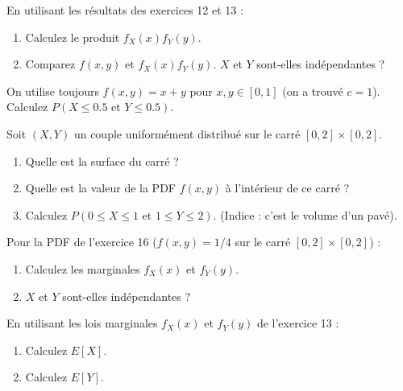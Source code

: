 \begin{exercicebox}
En utilisant les résultats des exercices 12 et 13 :
\begin{enumerate}
    \item Calculez le produit $f_X(x) f_Y(y)$.
    \item Comparez $f(x,y)$ et $f_X(x) f_Y(y)$. $X$ et $Y$ sont-elles indépendantes ?
\end{enumerate}
\end{exercicebox}

\begin{exercicebox}
On utilise toujours $f(x,y) = x+y$ pour $x, y \in [0, 1]$ (on a trouvé $c=1$).
Calculez $P(X \le 0.5 \text{ et } Y \le 0.5)$.
\end{exercicebox}

\begin{exercicebox}
Soit $(X, Y)$ un couple uniformément distribué sur le carré $[0, 2] \times [0, 2]$.
\begin{enumerate}
    \item Quelle est la surface du carré ?
    \item Quelle est la valeur de la PDF $f(x, y)$ à l'intérieur de ce carré ?
    \item Calculez $P(0 \le X \le 1 \text{ et } 1 \le Y \le 2)$. (Indice : c'est le volume d'un pavé).
\end{enumerate}
\end{exercicebox}

\begin{exercicebox}
Pour la PDF de l'exercice 16 ($f(x,y) = 1/4$ sur le carré $[0,2]\times[0,2]$) :
\begin{enumerate}
    \item Calculez les marginales $f_X(x)$ et $f_Y(y)$.
    \item $X$ et $Y$ sont-elles indépendantes ?
\end{enumerate}
\end{exercicebox}


\begin{exercicebox}
En utilisant les lois marginales $f_X(x)$ et $f_Y(y)$ de l'exercice 13 :
\begin{enumerate}
    \item Calculez $E[X]$.
    \item Calculez $E[Y]$.
\end{enumerate}
\end{exercicebox}

